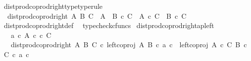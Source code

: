 \begin{isabellebody}
\isanewline
{}\isamarkupfalse%
\ dist{\isacharunderscore}{\kern0pt}prod{\isacharunderscore}{\kern0pt}coprod{\isacharunderscore}{\kern0pt}right{\isacharunderscore}{\kern0pt}type{\isacharbrackleft}{\kern0pt}type{\isacharunderscore}{\kern0pt}rule{\isacharbrackright}{\kern0pt}{\isacharcolon}{\kern0pt}\isanewline
\ \ {\isachardoublequoteopen}dist{\isacharunderscore}{\kern0pt}prod{\isacharunderscore}{\kern0pt}coprod{\isacharunderscore}{\kern0pt}right\ A\ B\ C\ {\isacharcolon}{\kern0pt}\ {\isacharparenleft}{\kern0pt}A\ {\isasymCoprod}\ B{\isacharparenright}{\kern0pt}\ {\isasymtimes}\isactrlsub c\ C\ {\isasymrightarrow}\ {\isacharparenleft}{\kern0pt}A\ {\isasymtimes}\isactrlsub c\ C{\isacharparenright}{\kern0pt}\ {\isasymCoprod}\ {\isacharparenleft}{\kern0pt}B\ {\isasymtimes}\isactrlsub c\ C{\isacharparenright}{\kern0pt}{\isachardoublequoteclose}\isanewline
%
\isadelimproof
\ \ %
\endisadelimproof
%
\isatagproof
{}\isamarkupfalse%
\ dist{\isacharunderscore}{\kern0pt}prod{\isacharunderscore}{\kern0pt}coprod{\isacharunderscore}{\kern0pt}right{\isacharunderscore}{\kern0pt}def\ \isamarkupfalse%
\ typecheck{\isacharunderscore}{\kern0pt}cfuncs%
\endisatagproof
{\isafoldproof}%
%
\isadelimproof
\isanewline
%
\endisadelimproof
\isanewline
{}\isamarkupfalse%
\ dist{\isacharunderscore}{\kern0pt}prod{\isacharunderscore}{\kern0pt}coprod{\isacharunderscore}{\kern0pt}right{\isacharunderscore}{\kern0pt}ap{\isacharunderscore}{\kern0pt}left{\isacharcolon}{\kern0pt}\isanewline
\ \ \ {\isachardoublequoteopen}a\ {\isasymin}\isactrlsub c\ A{\isachardoublequoteclose}\ {\isachardoublequoteopen}c\ {\isasymin}\isactrlsub c\ C{\isachardoublequoteclose}\isanewline
\ \ \ {\isachardoublequoteopen}dist{\isacharunderscore}{\kern0pt}prod{\isacharunderscore}{\kern0pt}coprod{\isacharunderscore}{\kern0pt}right\ A\ B\ C\ {\isasymcirc}\isactrlsub c\ {\isasymlangle}left{\isacharunderscore}{\kern0pt}coproj\ A\ B\ {\isasymcirc}\isactrlsub c\ a{\isacharcomma}{\kern0pt}\ c{\isasymrangle}\ {\isacharequal}{\kern0pt}\ left{\isacharunderscore}{\kern0pt}coproj\ {\isacharparenleft}{\kern0pt}A\ {\isasymtimes}\isactrlsub c\ C{\isacharparenright}{\kern0pt}\ {\isacharparenleft}{\kern0pt}B\ {\isasymtimes}\isactrlsub c\ C{\isacharparenright}{\kern0pt}\ {\isasymcirc}\isactrlsub c\ {\isasymlangle}a{\isacharcomma}{\kern0pt}\ c{\isasymrangle}{\isachardoublequoteclose}\isanewline
%
\isadelimproof
%
\endisadelimproof
%
\isatagproof
{}\isamarkupfalse%
\ {\isacharminus}{\kern0pt}\isanewline
\ \ \isamarkupfalse%

\end{isabellebody}

